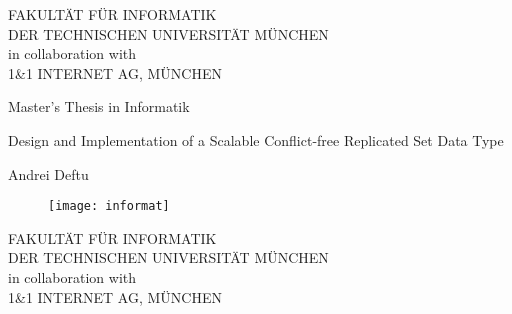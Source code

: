 \thispagestyle{empty}

\def\doctype{Master's Thesis in Informatik}
\def\title{
\begin{spacing}{1}
  Design and Implementation of a 
  Scalable Conflict-free Replicated Set Data Type
\end{spacing}} 
\def\titleGer{
\begin{spacing}{1}
  Design und Implementierung eines skalierbaren, konflikt-freien, replizierten
  Mengendatentyps
\end{spacing}}
\def\author{Andrei Deftu}
\def\date{October 15, 2012}
\def\footertext{}

\vspace{4cm}
\begin{center}
  \oTUM{4cm}

  \vspace{5mm}     
  \huge FAKULT{\"A}T F{\"U}R INFORMATIK\\ 
  \vspace{0.2cm}
  \large DER TECHNISCHEN UNIVERSIT{\"A}T M{\"U}NCHEN\\
  \vspace{0.5cm}
  in collaboration with\\
  \vspace{0.5cm}
  \large 1\&1 INTERNET AG, M{\"U}NCHEN\\
\end{center}

\vspace{15mm}

\begin{center}
  {\Large \doctype}
  \vspace{5mm}
  {\huge\bf \title}
  \vspace{15mm}
  {\LARGE  \author}
  \vspace{5mm}
  \begin{figure}[h!]
  \centering
    \texttt{[image: informat]}
  \end{figure}
\end{center}

\newpage
\thispagestyle{empty}

\vspace{10mm}
\begin{center}
  \oTUM{4cm}

  \vspace{5mm}     
  \huge FAKULT{\"A}T F{\"U}R INFORMATIK\\ 
  \vspace{0.2cm}
  \large DER TECHNISCHEN UNIVERSIT{\"A}T M{\"U}NCHEN\\
  \vspace{0.5cm}
  in collaboration with\\
  \vspace{0.5cm}
  \large 1\&1 INTERNET AG, M{\"U}NCHEN\\
\end{center}

